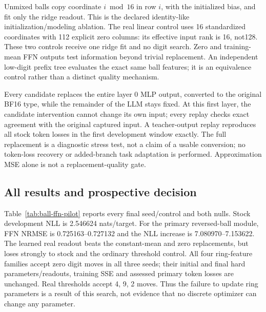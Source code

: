 \documentclass[11pt]{article}
\begin{document}
Unmixed balls copy coordinate \(i\bmod16\) in row \(i\), with the initialized
bias, and fit only the ridge readout. This is the declared identity-like
initialization/modeling ablation. The real linear control uses 16 standardized
coordinates with 112 explicit zero columns: its effective input rank is 16,
not128. These two controls receive one ridge fit and no digit search. Zero
and training-mean FFN outputs test information beyond trivial replacement.
An independent low-digit prefix tree evaluates the exact same ball features;
it is an equivalence control rather than a distinct quality mechanism.

Every candidate replaces the entire layer 0 MLP output, converted to the
original BF16 type, while the remainder of the LLM stays fixed. At this first
layer, the candidate intervention cannot change its own input; every replay
checks exact agreement with the original captured input. A teacher-output
replay reproduces all stock token losses in the first development window
exactly. The full replacement is a diagnostic stress test, not a claim of
a usable conversion; no token-loss recovery or added-branch task adaptation
is performed. Approximation MSE alone is not a replacement-quality gate.

\subsection{All results and prospective decision}

Table~\ref{tab:ball-ffn-pilot} reports every final seed/control and both nulls.
Stock development NLL is 2.546624 nats/target. For the primary reversed-ball
module, FFN NRMSE is 0.725163--0.727132 and the NLL increase is
7.080970--7.153622. The learned real readout beats the constant-mean and zero
replacements, but loses strongly to stock and the ordinary threshold control.
All four ring-feature families accept zero digit moves in all three seeds;
their initial and final hard parameters/readouts, training SSE and assessed
primary token losses are unchanged. Real thresholds accept 4, 9, 2 moves.
Thus the failure to update ring parameters is a result of this search,
not evidence that no discrete optimizer can change any parameter.
\end{document}
